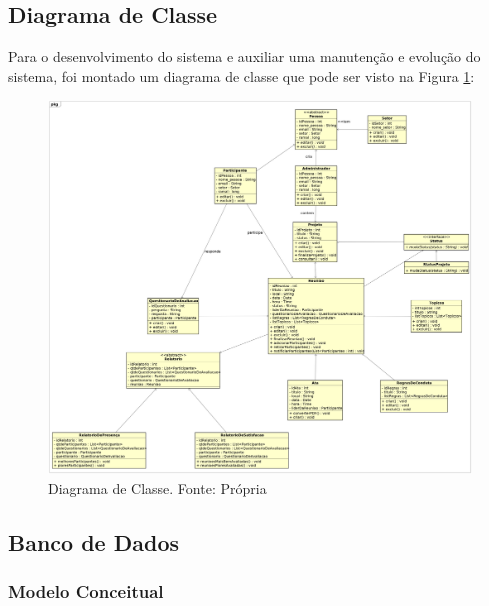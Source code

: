 \subsection{Diagrama de Classe}

Para o desenvolvimento do sistema e auxiliar uma manutenção e evolução do sistema, foi montado um diagrama de classe que pode ser visto na Figura \ref{img:diagrama_de_classe}:

\begin{figure}[H]
	\centering
	\includegraphics[width=1.0\textwidth]{figuras/diagramaDeClasse.png}
	\caption{Diagrama de Classe. Fonte: Própria}
	\label{img:diagrama_de_classe}
\end{figure}

\subsection{Banco de Dados}

\subsubsection{Modelo Conceitual}

